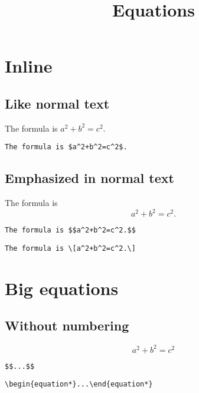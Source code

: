 \documentclass{article}
\title{Equations}
\begin{document}
\maketitle

\section{Inline}

\subsection{Like normal text}

The formula is $a^2+b^2=c^2$.

\begin{lstlisting}[frame=single]
The formula is $a^2+b^2=c^2$.
\end{lstlisting}

\subsection{Emphasized in normal text}

The formula is $$a^2+b^2=c^2.$$

\begin{lstlisting}[frame=single]
The formula is $$a^2+b^2=c^2.$$
\end{lstlisting}
\begin{lstlisting}[frame=single]
The formula is \[a^2+b^2=c^2.\]
\end{lstlisting}

\section{Big equations}

\subsection{Without numbering}

\begin{equation*}
a^2+b^2=c^2
\end{equation*}

\begin{lstlisting}[frame=single]
$$...$$
\end{lstlisting}

\begin{lstlisting}[frame=single]
\begin{equation*}...\end{equation*}
\end{lstlisting}
\end{document}
